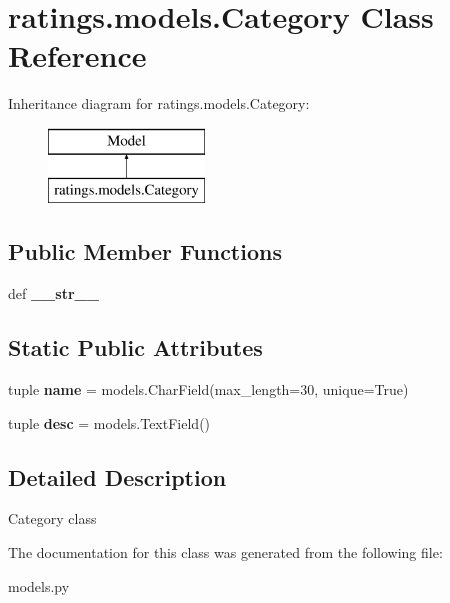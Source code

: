 \hypertarget{classratings_1_1models_1_1Category}{\section{ratings.\-models.\-Category Class Reference}
\label{classratings_1_1models_1_1Category}
}
Inheritance diagram for ratings.\-models.\-Category\-:\begin{figure}[H]
\begin{center}
\leavevmode
\includegraphics[height=2.000000cm]{classratings_1_1models_1_1Category}
\end{center}
\end{figure}
\subsection*{Public Member Functions}
\begin{DoxyCompactItemize}
\item 
\hypertarget{classratings_1_1models_1_1Category_abeb20d48c9ce44ca777c3adc34f6e50c}{def {\bfseries \-\_\-\-\_\-str\-\_\-\-\_\-}}\label{classratings_1_1models_1_1Category_abeb20d48c9ce44ca777c3adc34f6e50c}

\end{DoxyCompactItemize}
\subsection*{Static Public Attributes}
\begin{DoxyCompactItemize}
\item 
\hypertarget{classratings_1_1models_1_1Category_a82fc31efdb861f55e12c05bacd4436b1}{tuple {\bfseries name} = models.\-Char\-Field(max\-\_\-length=30, unique=True)}\label{classratings_1_1models_1_1Category_a82fc31efdb861f55e12c05bacd4436b1}

\item 
\hypertarget{classratings_1_1models_1_1Category_a22aa60b3b6e97175d01b7ea33af7b2d1}{tuple {\bfseries desc} = models.\-Text\-Field()}\label{classratings_1_1models_1_1Category_a22aa60b3b6e97175d01b7ea33af7b2d1}

\end{DoxyCompactItemize}


\subsection{Detailed Description}
\begin{DoxyVerb}Category class
\end{DoxyVerb}
 

The documentation for this class was generated from the following file\-:\begin{DoxyCompactItemize}
\item 
models.\-py\end{DoxyCompactItemize}
